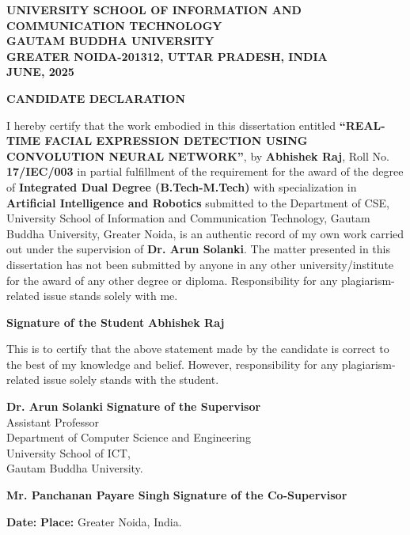 \newpage
\thispagestyle{empty}  %

\begin{center}
    \textbf{UNIVERSITY SCHOOL OF INFORMATION AND\\ 
    COMMUNICATION TECHNOLOGY}\\
    \textbf{GAUTAM BUDDHA UNIVERSITY}\\
    \textbf{GREATER NOIDA-201312, UTTAR PRADESH, INDIA}\\
    \textbf{JUNE, 2025}\\
\end{center}
\vspace{1cm}
\begin{center}
    \textbf{\large CANDIDATE DECLARATION}
\end{center}

\vspace{0.5cm}

I hereby certify that the work embodied in this dissertation entitled 
\textbf{“REAL-TIME FACIAL EXPRESSION DETECTION USING CONVOLUTION NEURAL NETWORK”}, 
by \textbf{Abhishek Raj}, Roll No. \textbf{17/IEC/003} in partial fulfillment of the requirement for the award of the degree of 
\textbf{Integrated Dual Degree (B.Tech-M.Tech)} with specialization in 
\textbf{Artificial Intelligence and Robotics} submitted to the Department of CSE, 
University School of Information and Communication Technology, 
Gautam Buddha University, Greater Noida, is an authentic record of my own work carried out under the supervision of 
\textbf{Dr. Arun Solanki}. 
The matter presented in this dissertation has not been submitted by anyone in any other university/institute for the award of any other degree or diploma. 
Responsibility for any plagiarism-related issue stands solely with me.

\vspace{1.5cm}

\noindent
\textbf{Signature of the Student} \hfill \textbf{Abhishek Raj}  %

\vspace{1.5cm}

This is to certify that the above statement made by the candidate is correct to the best of my knowledge and belief. 
However, responsibility for any plagiarism-related issue solely stands with the student.

\vspace{1.5cm}

\noindent
\textbf{Dr. Arun Solanki} \hfill \textbf{Signature of the Supervisor}\\
Assistant Professor\\
Department of Computer Science and Engineering\\
University School of ICT,\\
Gautam Buddha University.\\

\vspace{1.5cm}

\noindent
\textbf{Mr. Panchanan Payare Singh} \hfill \textbf{Signature of the Co-Supervisor}

\vspace{1.5cm}

\noindent
\textbf{Date:} \underline{\hspace{3cm}} \hfill \textbf{Place:} Greater Noida, India.


